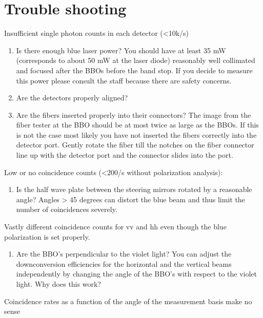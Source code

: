 \documentclass{../lab}
\begin{document}
\section{Trouble shooting}

Insufficient single photon counts in each detector (<10k/s)

\begin{enumerate}
    \item Is there enough blue laser power? You should have at least 35 mW (corresponds to about 50 mW at the laser diode) reasonably well collimated and focused after the BBOs before the band stop. If you decide to measure this power please consult the staff because there are safety concerns.

    \item Are the detectors properly aligned?

    \item Are the fibers inserted properly into their connectors? The image from the fiber tester at the BBO should be at most twice as large as the BBOs. If this is not the case most likely you have not inserted the fibers correctly into the detector port. Gently rotate the fiber till the notches on the fiber connector line up with the detector port and the connector slides into the port.
\end{enumerate}

\noindent Low or no coincidence counts (<200/s without polarization analysis):

\begin{enumerate}
    \item Is the half wave plate between the steering mirrors rotated by a reasonable angle? Angles > 45 degrees can distort the blue beam and thus limit the number of coincidences severely.
\end{enumerate}

\noindent Vastly different coincidence counts for vv and hh even though the blue polarization is set properly.

\begin{enumerate}
    \item Are the BBO's perpendicular to the violet light? You can adjust the downconversion efficiencies for the horizontal and the vertical beams independently by changing the angle of the BBO's with respect to the violet light. Why does this work?
\end{enumerate}

\noindent Coincidence rates as a function of the angle of the measurement basis make no sense
\end{document}
